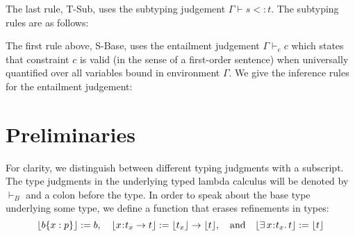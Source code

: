 \documentclass[11pt]{article}
\newcommand{\bind}{\hspace{0.05em}{:}\hspace{0.05em}} %
\newcommand{\col}{\mathbin{:}}       %
\newcommand{\lb}{\llbracket}         %
\newcommand{\rb}{\rrbracket}         %
\newcommand{\many}{\hookrightarrow^*}
\newcommand{\true}{\mathtt{true}}
\begin{document}
The last rule, {\sc T-Sub}, uses the subtyping judgement $\Gamma \vdash s <: t$. The subtyping rules are as follows:


The first rule above, {\sc S-Base}, uses the entailment judgement $\Gamma \vdash_e c$ which states that constraint $c$ is valid (in the sense of a first-order sentence) when universally quantified over all variables bound in environment $\Gamma$.
We give the inference rules for the entailment judgement:



\section{Preliminaries}

For clarity, we distinguish between different typing judgments with a subscript.  The type judgments in the underlying typed lambda calculus will be denoted by $\vdash_B$ and a colon before the type. In order to speak about the base type underlying some type, we define a function that erases refinements in types:
\[
\lfloor b\{x:p\} \rfloor := b, \quad
\lfloor x\bind t_x \rightarrow t\rfloor := \lfloor t_x \rfloor \rightarrow \lfloor t \rfloor
, \quad{\rm and}\quad
\lfloor \exists\, x\bind t_x.\, t\rfloor := \lfloor t\rfloor
\]
\end{document}
